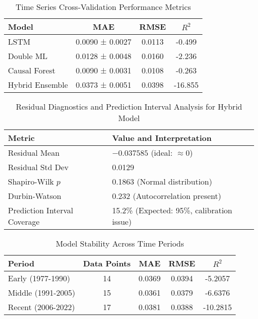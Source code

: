 \begin{table}[H]
\centering
\small
\caption{Time Series Cross-Validation Performance Metrics}
\label{tab:cross_val_perf}
\begin{tabular}{|l|c|c|c|}
\hline
\textbf{Model} & \textbf{MAE} & \textbf{RMSE} & \textbf{\( R^2 \)} \\
\hline
LSTM            & 0.0090 ± 0.0027 & 0.0113 & -0.499 \\
Double ML       & 0.0128 ± 0.0048 & 0.0160 & -2.236 \\
Causal Forest   & 0.0090 ± 0.0031 & 0.0108 & -0.263 \\
Hybrid Ensemble & 0.0373 ± 0.0051 & 0.0398 & -16.855 \\
\hline
\end{tabular}
\end{table}

\vspace{0.3cm}

\begin{table}[H]
\centering
\small
\caption{Residual Diagnostics and Prediction Interval Analysis for Hybrid Model}
\label{tab:residual_diag}
\begin{tabular}{|l|l|}
\hline
\textbf{Metric} & \textbf{Value and Interpretation} \\
\hline
Residual Mean       & $-0.037585$ (ideal: $\approx 0$) \\
Residual Std Dev    & 0.0129 \\
Shapiro-Wilk $p$    & 0.1863 (Normal distribution) \\
Durbin-Watson       & 0.232 (Autocorrelation present) \\
Prediction Interval Coverage & 15.2\% (Expected: 95\%, calibration issue) \\
\hline
\end{tabular}
\end{table}

\vspace{0.3cm} 

\begin{table}[H]
\centering
\small
\caption{Model Stability Across Time Periods}
\label{tab:stability}
\begin{tabular}{|l|c|c|c|c|}
\hline
\textbf{Period} & \textbf{Data Points} & \textbf{MAE} & \textbf{RMSE} & \textbf{\( R^2 \)} \\
\hline
Early (1977-1990) & 14 & 0.0369 & 0.0394 & -5.2057 \\
Middle (1991-2005) & 15 & 0.0361 & 0.0379 & -6.6376 \\
Recent (2006-2022) & 17 & 0.0381 & 0.0388 & -10.2815 \\
\hline
\end{tabular}
\end{table}

